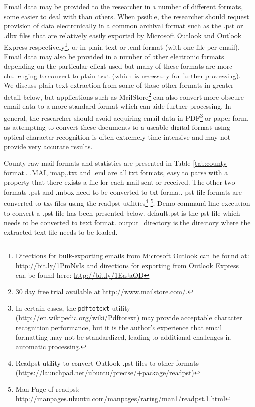 \documentclass[fleqn]{MJDArticle}
\begin{document}
 Email data may be provided to the researcher in a number of different formats, some easier to deal with than others. When pssible, the researcher should request provision of data electronically in a common archival format such as the .pst or .dbx files that are relatively easily exported by Microsoft Outlook and Outlook Express respectively\footnote{Directions for bulk-exporting emails from Microsoft Outlook can be found at: \href{http://bit.ly/1PmNvIs}{http://bit.ly/1PmNvIs} and directions for exporting from Outlook Express can be found here: \href{http://bit.ly/1EaJaQD}{http://bit.ly/1EaJaQD}}, or in plain text or .eml format (with one file per email). Email data may also be provided in a number of other electronic formats depending on the particular client used but many of these formats are more challenging to convert to plain text (which is necessary for further processing). We discuss plain text extraction from some of these other formats in greater detail below, but applications such as MailStore\footnote{30 day free trial available at \href{http://www.mailstore.com/}{http://www.mailstore.com/}.} can also convert more obscure email data to a more standard format which can aide further processing. In general, the researcher should avoid acquiring email data in PDF\footnote{In certain cases, the \texttt{pdftotext} utility (\href{http://en.wikipedia.org/wiki/Pdftotext}{http://en.wikipedia.org/wiki/Pdftotext}) may provide acceptable character recognition performance, but it is the author's experience that email formatting may not be standardized, leading to additional challenges in automatic processing.} or paper form, as attempting to convert these documents to a useable digital format using optical character recognition is often extremely time intensive and may not provide very accurate results. \par
   County raw mail formats and statistics are presented in Table \ref{tab:county format}. .MAI,.imap,.txt and .eml are all txt formats, easy to parse with a property that there exists a file for each mail sent or received. The other two formats .pst and .mbox need to be converted to txt format. pst file formats are converted to txt files using the readpst utilities\footnote{Readpst utility to convert Outlook .pst files to other formats (\href{https://launchpad.net/ubuntu/precise/+package/readpst}{https://launchpad.net/ubuntu/precise/+package/readpst}) } \footnote{Man Page of readpst: \href{http://manpages.ubuntu.com/manpages/raring/man1/readpst.1.html}{http://manpages.ubuntu.com/manpages/raring/man1/readpst.1.html}}. Demo command line execution to convert a .pst file has been presented below. default.pst is the pst file which needs to be converted to text format. output\_directory is the directory where the extracted text file needs to be loaded.
\end{document}
